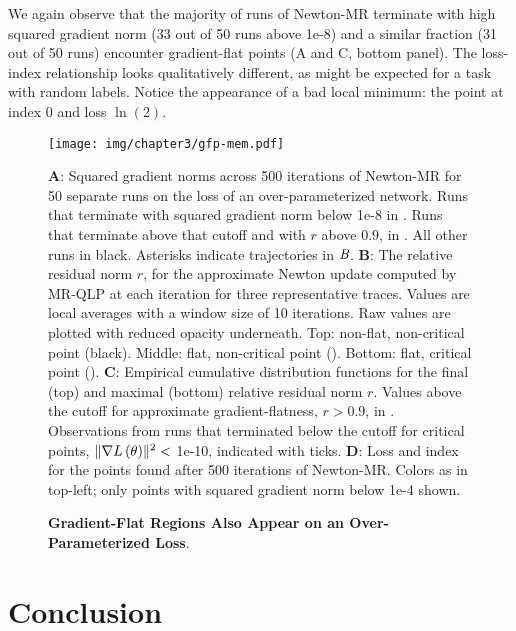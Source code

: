 \documentclass[../../thesis.tex]{subfiles}
\begin{document}
We again observe that the majority of runs of Newton-MR
terminate with high squared gradient norm
(33 out of 50 runs above 1e-8)
and a similar fraction
(31 out of 50 runs)
encounter gradient-flat points
(A and C, bottom panel).
The loss-index relationship looks qualitatively different,
as might be expected for a task with random labels.
Notice the appearance of a bad local minimum:
the \successcolor{} point at index 0 and loss $\ln(2)$.

\begin{figure}[!hp]
	\begin{center}
		\texttt{[image: img/chapter3/gfp-mem.pdf]}
	\end{center}
	\caption{\textbf{Gradient-Flat Regions Also Appear on an Over-Parameterized Loss}.}{%
	\textbf{A}:
	Squared gradient norms across 500 iterations of Newton-MR
	for 50 separate runs on the loss of an over-parameterized network.
	Runs that terminate with squared gradient norm below 1e-8
	in \successcolor{}.
	Runs that terminate above that cutoff and with $r$ above $0.9$,
	in \failcolor{}.
	All other runs in black.
	Asterisks indicate trajectories in $\emph{B}$.
	\textbf{B}:
	The relative residual norm $r$,
	for the approximate Newton update
	computed by MR-QLP at each iteration
	for three representative traces.
	Values are local averages with a window size of 10 iterations.
	Raw values are plotted with reduced opacity underneath.
	Top: non-flat, non-critical point (black).
	Middle: flat, non-critical point (\failcolor{}).
	Bottom: flat, critical point (\successcolor{}).
	\textbf{C}:
	Empirical cumulative distribution functions for
	the final (top) and maximal (bottom) relative residual norm $r$.
	Values above the cutoff for approximate gradient-flatness, $r>0.9$,
	in \failcolor{}.
	Observations from runs that terminated below the cutoff for critical points,
	$\lVert\nabla L\left(\theta\right)\rVert^2 <$ 1e-10,
	indicated with \successcolor{} ticks.
	\textbf{D}:
	Loss and index for the points found
	after 500 iterations of Newton-MR\@.
	Colors as in top-left; only points with squared gradient norm below 1e-4 shown.%
	}
\end{figure}


\section{Conclusion}%
\end{document}
